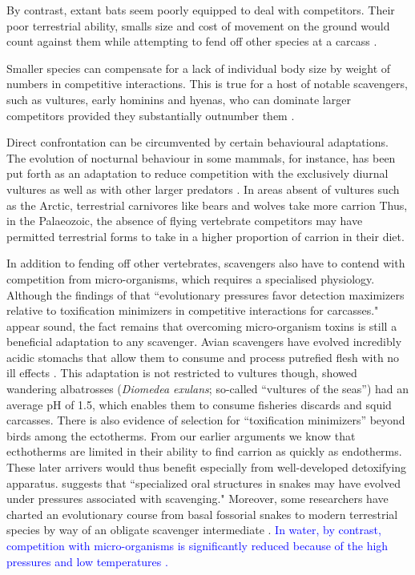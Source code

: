 \documentclass[a4paper,12pt]{article}
\begin{document}
By contrast, extant bats seem poorly equipped to deal with competitors. 
Their poor terrestrial ability, smalls size and cost of movement on the ground would count against them while attempting to fend off other species at a carcass \citep{riskin2006terrestrial,voigt2012terrestrial}.

Smaller species can compensate for a lack of individual body size by weight of numbers in competitive interactions. 
This is true for a host of notable scavengers, such as vultures, early hominins and hyenas, who can dominate larger competitors provided they substantially outnumber them \citep{KaneVul,trinkel2005competitive,ruxton2013endurance}. 

Direct confrontation can be circumvented by certain behavioural adaptations. 
The evolution of nocturnal behaviour in some mammals, for instance, has been put forth as an adaptation to reduce competition with the exclusively diurnal vultures as well as with other larger predators \citep{gittleman2013carnivore,moleon2014inter,pereira2014facultative}. 
In areas absent of vultures such as the Arctic, terrestrial carnivores like bears and wolves take more carrion \citep{devault2003scavenging}
Thus, in the Palaeozoic, the absence of flying vertebrate competitors may have permitted terrestrial forms to take in a higher proportion of carrion in their diet.

In addition to fending off other vertebrates, scavengers also have to contend with competition from micro-organisms, which requires a specialised physiology. 
Although the findings of \cite{shivik2006vultures} that ``evolutionary pressures favor detection maximizers relative to toxification minimizers in competitive interactions for carcasses." appear sound, the fact remains that overcoming micro-organism toxins is still a beneficial adaptation to any scavenger. 
Avian scavengers have evolved incredibly acidic stomachs that allow them to consume and process putrefied flesh with no ill effects \citep{houston1975digestive,roggenbuck2014microbiome}. 
This adaptation is not restricted to vultures though, \cite{gremillet2012vultures} showed wandering albatrosses (\textit{Diomedea exulans}; so-called ``vultures of the seas'') had an average pH of 1.5, which enables them to consume fisheries discards and squid carcasses. 
There is also evidence of selection for ``toxification minimizers'' beyond birds among the ectotherms.
From our earlier arguments we know that ecthotherms are limited in their ability to find carrion as quickly as endotherms. 
These later arrivers would thus benefit especially from well-developed detoxifying apparatus. 
\cite{shivik2006vultures} suggests that ``specialized oral structures in snakes may have evolved under pressures associated with scavenging."
Moreover, some researchers have charted an evolutionary course from basal fossorial snakes to modern terrestrial species by way of an obligate scavenger intermediate \citep{bauchot2006snakes}. 
\textcolor{blue}{In water, by contrast, competition with micro-organisms is significantly reduced because of the high pressures and low temperatures \citep{beasley2012carrion}.}
\end{document}
